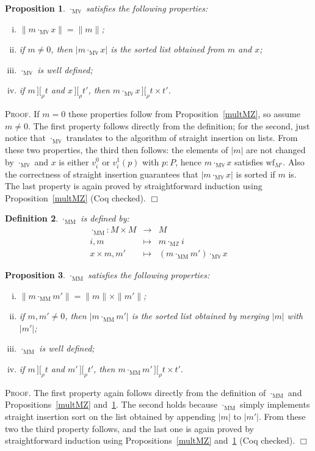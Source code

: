 \documentclass{article}
\newtheorem{definition}{Definition}[section]
\newtheorem{proposition}[definition]{Proposition}
\newenvironment{proof}{\smallskip\textsc{Proof.}}{\hspace*{\fill}$\Box$}
\newcommand{\intII}{\,]\![}
\newcommand{\intrel}{\mathbin{\intII_{\rho}}}
\newcommand{\Z}{{\mathbb Z}}
\newcommand{\V}{{\mathbb V}}
\newcommand{\wf}{\ensuremath{\mathrm{wf}}}
\newcommand{\multMZ}{\ensuremath{\cdot_{\mathrm M\Z}}}
\newcommand{\multMV}{\ensuremath{\cdot_{\mathrm M\V}}}
\newcommand{\multMM}{\ensuremath{\cdot_{\mathrm{MM}}}}
\begin{document}
\begin{proposition}\label{multMV}
{\multMV} satisfies the following properties:
\begin{enumerate}[(i)]
\item $\|m\multMV x\|=\|m\|$;
\item if $m\neq 0$, then $|m\multMV x|$ is the sorted
list obtained from $m$ and $x$;
\item {\multMV} is well defined;
\item if $m\intrel t$ and $x\intrel t'$, then
$m\multMV x\intrel t\times t'$.
\end{enumerate}
\end{proposition}
\begin{proof}
If $m=0$ these properties follow from Proposition~\ref{multMZ}, so assume
$m\neq 0$.
The first property follows directly from the definition; for the
second, just notice that {\multMV} translates to the
algorithm of straight insertion on lists.
From these two properties, the third then follows: the elements of $|m|$
are not changed by {\multMV} and $x$ is either $v^0_i$ or
$v^1_i(p)$ with $p:P$, hence $m\multMV x$ satisfies $\wf_{M'}$.
Also the correctness of straight insertion guarantees that
$|m\multMV x|$ is sorted if $m$ is.
The last property is again proved by straightforward induction using
Proposition~\ref{multMZ} (Coq checked).
\end{proof}

\begin{definition}\label{defn:multMM} {\multMM} is defined by:
\begin{eqnarray*}
\multMM : M \times M & \to & M \\
 i, m & \mapsto & m\multMZ i \\
 x\times m, m' & \mapsto & (m\multMM m')\multMV x
\end{eqnarray*}
\end{definition}

\begin{proposition}\label{multMM}
{\multMM} satisfies the following properties:
\begin{enumerate}[(i)]
\item $\|m\multMM m'\|=\|m\|\times\|m'\|$;
\item if $m,m'\neq 0$, then $|m\multMM m'|$ is the sorted
list obtained by merging $|m|$ with $|m'|$;
\item {\multMM} is well defined;
\item if $m\intrel t$ and $m'\intrel t'$, then
$m\multMM m'\intrel t\times t'$.
\end{enumerate}
\end{proposition}
\begin{proof}
The first property again follows directly from the definition of {\multMM}
and Propositions~\ref{multMZ} and~\ref{multMV}.
The second holds because {\multMM} simply implements straight insertion sort
on the list obtained by appending $|m|$ to $|m'|$.
From these two the third property follows, and the last one is again proved by
straightforward induction using Propositions~\ref{multMZ} and~\ref{multMV}
(Coq checked).
\end{proof}
\end{document}

